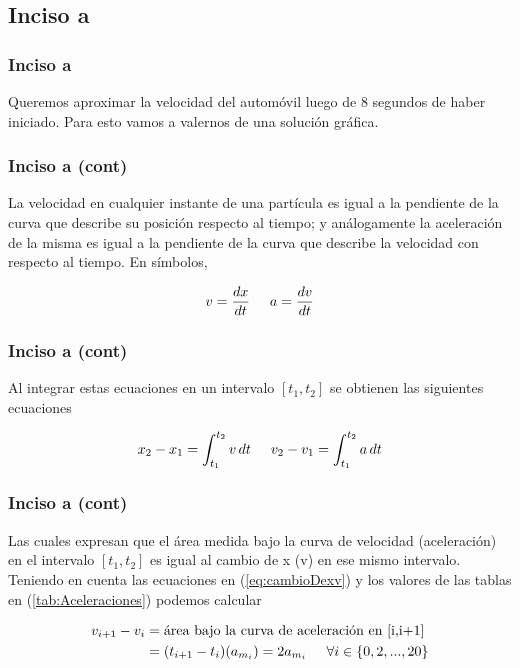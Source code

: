 \documentclass[11pt]{beamer}
\begin{document}
	\subsection{Inciso a}
	\begin{frame}
		\frametitle{Inciso a}
		
		Queremos aproximar la velocidad del automóvil luego de 8 segundos de haber iniciado. Para esto vamos a valernos de una solución gráfica.
	\end{frame}

	\begin{frame}
		\frametitle{Inciso a (cont)}
		La velocidad en cualquier instante de una partícula es igual a la pendiente de la curva que describe su posición respecto al tiempo; y análogamente la aceleración de la misma es igual a la pendiente de la curva que describe la velocidad con respecto al tiempo. En símbolos,\\
		
		\begin{block}{}
			\begin{equation} \label{eq:ffundamentales}
			v = \frac{dx}{dt} \hspace{5mm} a = \frac{dv}{dt}
			\end{equation}
		\end{block}
	\end{frame}

	\begin{frame}
		\frametitle{Inciso a (cont)}
		
		Al integrar estas ecuaciones en un intervalo $[t_{1}, t_{2}]$ se obtienen las siguientes ecuaciones
		
		\begin{equation} \label{eq:cambioDexv}
		x_{2} - x_{1} = \int_{t_{1}}^{t_{2}} v \, dt \hspace{5mm} v_{2} - v_{1} = \int_{t_{1}}^{t_{2}} a \, dt
		\end{equation}
	\end{frame}

	\begin{frame}
		\frametitle{Inciso a (cont)}
		
		Las cuales expresan que el \alert{área} medida bajo la curva de velocidad (aceleración) en el intervalo $[t_{1}, t_{2}]$ es igual al \alert{cambio} de x (v) en ese mismo intervalo. Teniendo en cuenta las ecuaciones en (\ref{eq:cambioDexv}) y los valores de las tablas en (\ref{tab:Aceleraciones}) podemos calcular
		
		\begin{align*}
		v_{i+1} - v_{i} &= \text{área bajo la curva de aceleración en [i,i+1]} \;\\
		                &= (t_{i+1} - t_{i})(a_{m_{i}}) = 2a_{m_{i}} \hspace{5mm} \forall i \in \{0,2,...,20\}\\
		\end{align*}
	\end{frame}
\end{document}
